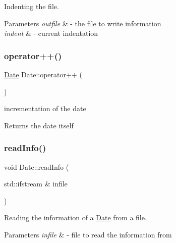 Indenting the file. 


\begin{DoxyParams}{Parameters}
{\em outfile} & -\/ the file to write information \\
\hline
{\em indent} & -\/ current indentation \\
\hline
\end{DoxyParams}
\mbox{\label{class_date_a0c5386da90c6834a3e7a110b02e2abaa}} 
\subsubsection{\texorpdfstring{operator++()}{operator++()}}
{\footnotesize\ttfamily \mbox{\hyperlink{class_date}{Date}} Date\+::operator++ (\begin{DoxyParamCaption}{ }\end{DoxyParamCaption})}



incrementation of the date 

\begin{DoxyReturn}{Returns}
the date itself 
\end{DoxyReturn}
\mbox{\label{class_date_ad23dffa000ed62018a399c519acb06db}} 
\subsubsection{\texorpdfstring{read\+Info()}{readInfo()}}
{\footnotesize\ttfamily void Date\+::read\+Info (\begin{DoxyParamCaption}\item[{std\+::ifstream \&}]{infile }\end{DoxyParamCaption})}



Reading the information of a \mbox{\hyperlink{class_date}{Date}} from a file. 


\begin{DoxyParams}{Parameters}
{\em infile} & -\/ file to read the information from \\
\hline
\end{DoxyParams}
\mbox{\label{class_date_a9385a826469d0978e3491bdff9739f6f}} 

